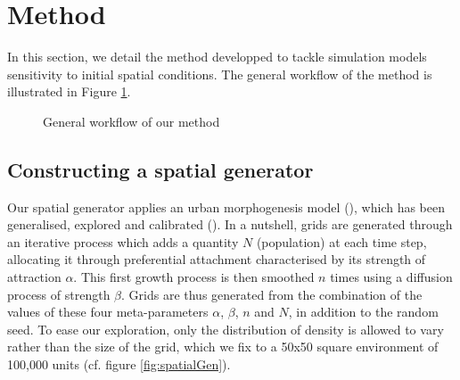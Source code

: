 \documentclass[Afour,sageh,times]{sagej}
\begin{document}
\section{Method}


In this section, we detail the method developped to tackle simulation models sensitivity to initial spatial conditions. The general workflow of the method is illustrated in Figure \ref{fig:method}.


\begin{figure}[htbp] \begin{center} 
 \caption{General workflow of our method} \label{fig:method} \end{center} \end{figure} %





\subsection{Constructing a spatial generator}

Our spatial generator applies an urban morphogenesis model (\cite{Batty2007}), which has been generalised, explored and calibrated (\cite{Raimbault2014}). In a nutshell, grids are generated through an iterative process which adds a quantity $N$ (population) at each time step, allocating it through preferential attachment characterised by its strength of attraction $\alpha$. This first growth process is then smoothed $n$ times using a diffusion process of strength $\beta$. Grids are thus generated from the combination of the values of these four meta-parameters $\alpha$, $\beta$, $n$ and $N$, in addition to the random seed. To ease our exploration, only the distribution of density is allowed to vary rather than the size of the grid, which we fix to a 50x50 square environment of 100,000 units (cf. figure \ref{fig:spatialGen}).
\end{document}
